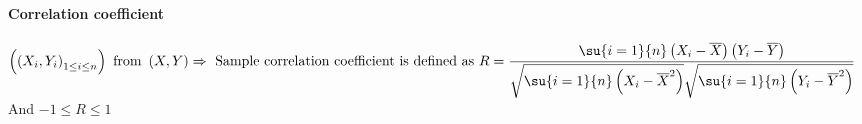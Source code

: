 \paragraph{Correlation coefficient}
$\left(\left(X_{i},Y_{i}\right)_{1\leq i\leq n}\right)\text{ from }
\left(X,Y\right) \Rightarrow
\text{ Sample correlation coefficient is defined as }\\
R = \dfrac{\su{{i=1}}{n}\left(X_{i}-\overline{X}\right)\left(Y_{i}-\overline{Y}\right)}{\sqrt{\su{{i=1}}{n}\left(X_{i}-\overline{X}^{2}\right)}\sqrt{\su{{i=1}}{n}\left(Y_{i}-\overline{Y}^{2}\right)}}$\\
And $-1\leq R\leq 1$

